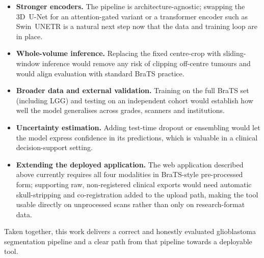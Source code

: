 \begin{itemize}
  \item \textbf{Stronger encoders.} The pipeline is architecture-agnostic;
        swapping the 3D~U-Net for an attention-gated variant
        \citep{oktay2018attentionunet} or a transformer encoder such as
        Swin~UNETR \citep{hatamizadeh2022swinunetr} is a natural next step now
        that the data and training loop are in place.
  \item \textbf{Whole-volume inference.} Replacing the fixed centre-crop with
        sliding-window inference would remove any risk of clipping off-centre
        tumours and would align evaluation with standard BraTS practice.
  \item \textbf{Broader data and external validation.} Training on the full BraTS
        set (including LGG) and testing on an independent cohort would establish
        how well the model generalises across grades, scanners and institutions.
  \item \textbf{Uncertainty estimation.} Adding test-time dropout or ensembling
        would let the model express confidence in its predictions, which is
        valuable in a clinical decision-support setting.
  \item \textbf{Extending the deployed application.} The web application
        described above currently requires all four modalities in BraTS-style
        pre-processed form; supporting raw, non-registered clinical exports
        would need automatic skull-stripping and co-registration added to the
        upload path, making the tool usable directly on unprocessed scans
        rather than only on research-format data.
\end{itemize}

Taken together, this work delivers a correct and honestly evaluated glioblastoma
segmentation pipeline and a clear path from that pipeline towards a deployable
tool.
